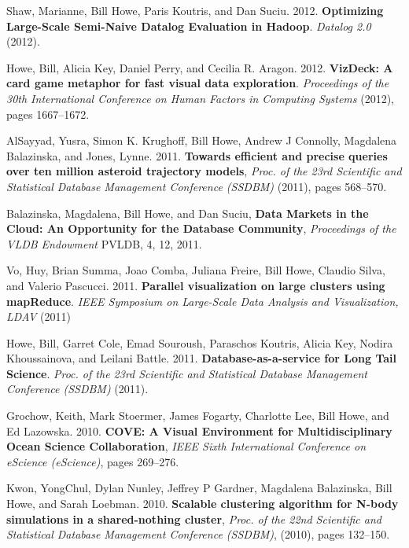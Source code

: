 \begin{bulletlist}
\item Shaw, Marianne, Bill Howe, Paris Koutris, and
Dan Suciu. 2012. \textbf{Optimizing Large-Scale Semi-Naive Datalog Evaluation in
Hadoop}. \emph{Datalog 2.0} (2012). 

\item Howe, Bill, Alicia Key, Daniel Perry, and Cecilia R. Aragon. 2012. 
\textbf{VizDeck: A card game metaphor for fast visual data exploration}. \emph{Proceedings of the 30th International Conference on Human Factors in Computing Systems} (2012), pages 1667--1672. 

\item AlSayyad, Yusra, Simon K. Krughoff, Bill Howe, Andrew J Connolly, Magdalena Balazinska,
and Jones, Lynne. 2011. \textbf{Towards efficient and precise queries over ten million asteroid trajectory models}, \emph{Proc. of the 23rd Scientific and Statistical
Database Management Conference (SSDBM)} (2011), pages 568--570.

\item Balazinska, Magdalena, Bill Howe, and Dan Suciu,
\textbf{Data Markets in the Cloud: An Opportunity for the Database Community},
\emph{Proceedings of the VLDB Endowment} PVLDB, 4, 12, 2011. 

\item Vo, Huy, Brian Summa, Joao Comba, Juliana Freire, Bill Howe, Claudio Silva, and Valerio
Pascucci. 2011. \textbf{Parallel visualization on large clusters using
mapReduce}. \emph{{IEEE} Symposium on Large-Scale Data Analysis and Visualization, {LDAV}}
(2011)

\item Howe, Bill, Garret Cole, Emad Souroush, Paraschos Koutris, Alicia Key, Nodira
Khoussainova, and Leilani Battle. 2011. \textbf{Database-as-a-service for Long
Tail Science}. \emph{Proc. of the 23rd Scientific and Statistical
Database Management Conference (SSDBM)} (2011). 

\item Grochow, Keith, Mark Stoermer, James Fogarty, Charlotte Lee, Bill Howe, and Ed Lazowska. 2010. \textbf{COVE: A Visual Environment for Multidisciplinary Ocean Science Collaboration},
\emph{IEEE Sixth International Conference on eScience (eScience)}, pages 269--276.

\item Kwon, YongChul, Dylan Nunley, Jeffrey P Gardner, Magdalena Balazinska, Bill Howe, and Sarah Loebman. 2010. \textbf{Scalable clustering algorithm for N-body simulations in a shared-nothing cluster}, \emph{Proc. of the 22nd Scientific and Statistical
Database Management Conference (SSDBM)}, (2010), pages 132--150.


\end{bulletlist}

